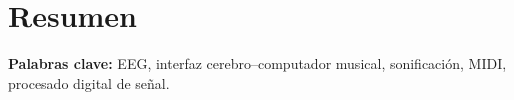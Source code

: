 \documentclass[../main.tex]{subfiles}
\begin{document}
\section*{Resumen}


\vspace{12pt}

\textbf{Palabras clave:} EEG, interfaz cerebro--computador musical, sonificación, MIDI, procesado digital de señal.
\end{document}

